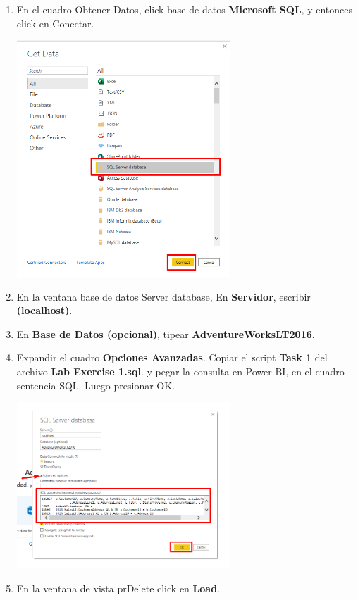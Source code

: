 \documentclass[12pt,letterpaper]{article}
\newcommand\tab[1][1cm]{\hspace*{#1}}
\begin{document}
\begin{enumerate}[\tab 1.]
\begin{center}
        \end{center}
        \item En el cuadro Obtener Datos, click base de datos \textbf{Microsoft SQL}, y entonces click en Conectar.
        \begin{center}
            \includegraphics[width=8cm]{./img/img6.png}
        \end{center}
        \item En la ventana base de datos Server database, En \textbf{Servidor}, escribir \textbf{(localhost)}.
        \item En \textbf{Base de Datos (opcional)}, tipear \textbf{AdventureWorksLT2016}.
        \item Expandir el cuadro \textbf{Opciones Avanzadas}. Copiar el script \textbf{Task 1} del archivo \textbf{Lab Exercise 1.sql}. y pegar la consulta en Power BI, en el cuadro sentencia SQL. Luego presionar OK.
        \begin{center}
            \includegraphics[width=8cm]{./img/img9.png}
        \end{center}
        \item En la ventana de vista prDelete click en \textbf{Load}.

\end{enumerate}
\end{document}
